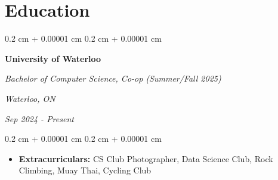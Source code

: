 \documentclass[10pt, letterpaper]{article}
\newenvironment{highlights}{
    \begin{itemize}[
        topsep=0.10 cm,
        parsep=0.10 cm,
        partopsep=0pt,
        itemsep=0pt,
        leftmargin=0.4 cm + 10pt
    ]
}{
    \end{itemize}
} %
\newenvironment{highlightsforbulletentries}{
    \begin{itemize}[
        topsep=0.10 cm,
        parsep=0.10 cm,
        partopsep=0pt,
        itemsep=0pt,
        leftmargin=10pt
    ]
}{
    \end{itemize}
} %
\newenvironment{onecolentry}{
    \begin{adjustwidth}{
        0.2 cm + 0.00001 cm
    }{
        0.2 cm + 0.00001 cm
    }
}{
    \end{adjustwidth}
} %
\newenvironment{twocolentry}[2][]{
    \onecolentry
    \def\secondColumn{#2}
    \setcolumnwidth{\fill, 4.5 cm}
    \begin{paracol}{2}
}{
    \switchcolumn \raggedleft \secondColumn
    \end{paracol}
    \endonecolentry
} %
\let\hrefWithoutArrow\href
\renewcommand{\href}[2]{\hrefWithoutArrow{#1}{\ifthenelse{\equal{#2}{}}{ }{#2 }\raisebox{.15ex}{\footnotesize \faExternalLink*}}}
\begin{document}


    









    \section{Education}
        
        \begin{twocolentry}{

        \textit{Waterloo, ON}
            
        \textit{Sep 2024 - Present}}
            \textbf{University of Waterloo}

            \textit{Bachelor of Computer Science, Co-op (Summer/Fall 2025)}
        \end{twocolentry}

        \vspace{0.10 cm}
        \begin{onecolentry}
            \begin{highlights}
                \item \textbf{Extracurriculars:} CS Club Photographer, Data Science Club, Rock Climbing, Muay Thai, Cycling Club
            \end{highlights}
        \end{onecolentry}
\end{document}

